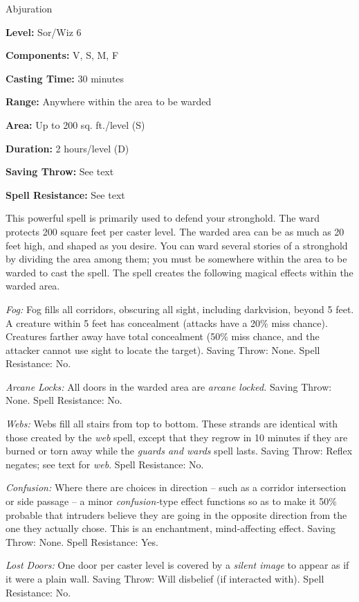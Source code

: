 
Abjuration

\textbf{Level:} Sor/Wiz 6

\textbf{Components:} V, S, M, F

\textbf{Casting Time:} 30 minutes

\textbf{Range:} Anywhere within the area to be warded

\textbf{Area:} Up to 200 sq. ft./level (S)

\textbf{Duration:} 2 hours/level (D)

\textbf{Saving Throw:} See text

\textbf{Spell Resistance:} See text

This powerful spell is primarily used to defend your stronghold. The ward protects 
200 square feet per caster level. The warded area can be as much as 20 feet high, 
and shaped as you desire. You can ward several stories of a stronghold by dividing 
the area among them; you must be somewhere within the area to be warded to cast 
the spell. The spell creates the following magical effects within the warded area.

\textit{Fog:} Fog fills all corridors, obscuring all sight, including darkvision, 
beyond 5 feet. A creature within 5 feet has concealment (attacks have a 20\% miss 
chance). Creatures farther away have total concealment (50\% miss chance, and the 
attacker cannot use sight to locate the target). Saving Throw: None. Spell Resistance: 
No.

\textit{Arcane Locks:} All doors in the warded area are \textit{arcane locked. 
}Saving Throw: None. Spell Resistance: No.

\textit{Webs:} Webs fill all stairs from top to bottom. These strands are identical 
with those created by the \textit{web} spell, except that they regrow in 10 minutes 
if they are burned or torn away while the \textit{guards and wards} spell lasts. 
Saving Throw: Reflex negates; see text for \textit{web}. Spell Resistance: No.

\textit{Confusion:} Where there are choices in direction -- such as a corridor intersection 
or side passage -- a minor \textit{confusion-}type effect functions so as to make 
it 50\% probable that intruders believe they are going in the opposite direction 
from the one they actually chose. This is an enchantment, mind-affecting effect. 
Saving Throw: None. Spell Resistance: Yes.

\textit{Lost Doors:} One door per caster level is covered by a \textit{silent image 
}to appear as if it were a plain wall. Saving Throw: Will disbelief (if interacted 
with). Spell Resistance: No.

